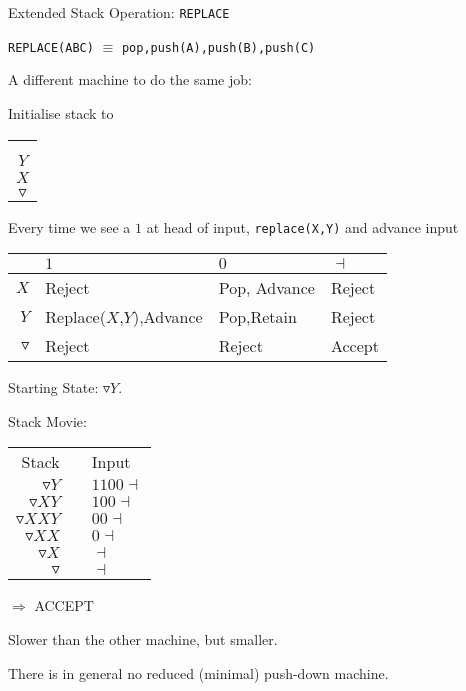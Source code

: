 \documentclass[a4paper,12pt]{article}
\begin{document}
Extended Stack Operation: \verb!REPLACE!

\verb!REPLACE(ABC)! $\equiv$ \verb!pop,push(A),push(B),push(C)!


A different machine to do the same job:

Initialise stack to

\begin{tabular}{|c|}
		\\
\hspace{20mm}	\\
		\\
\hline
$Y$	\\
\hline
$X$	\\
\hline
$\triangledown$	\\
\hline
\end{tabular}

Every time we see a $1$ at head of input, \verb!replace(X,Y)! and
advance input


\begin{tabular}{r|l|l|l|}
\hline
		&		$1$		&			$0$			&	$\dashv$				\\
\hline
$X$	&	Reject		&	Pop, Advance 		& Reject 				\\
\hline
$Y$	&	Replace($X$,$Y$),Advance	&	Pop,Retain		& Reject \\
\hline
$\triangledown$	&	Reject		& Reject 			& Accept	\\
\hline
\end{tabular}


Starting State: $\triangledown Y$.

Stack Movie:

\begin{tabular}{rcl}
Stack								&		&	Input				\\
$\triangledown Y$			&		&	$1100\dashv$	\\	
$\triangledown X Y$		&		&	$100\dashv$	\\	
$\triangledown X X Y$	&		&	$00\dashv$	\\	
$\triangledown X X$		&		&	$0\dashv$	\\	
$\triangledown X$			&		&	$\dashv$	\\	
$\triangledown$			&		&	$\dashv$	\\	
\end{tabular}

$\Rightarrow$ ACCEPT

Slower than the other machine, but smaller.


There is in general no reduced (minimal) push-down machine.
\end{document}

